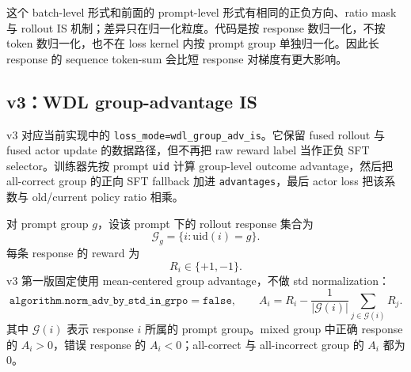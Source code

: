这个 batch-level 形式和前面的 prompt-level 形式有相同的正负方向、ratio mask 与 rollout IS 机制；差异只在归一化粒度。代码是按 response 数归一化，不按 token 数归一化，也不在 loss kernel 内按 prompt group 单独归一化。因此长 response 的 sequence token-sum 会比短 response 对梯度有更大影响。

\subsection{v3：WDL group-advantage IS}
\label{subsec:v3}

v3 对应当前实现中的 \texttt{loss\_mode=wdl\_group\_adv\_is}。它保留 fused rollout 与 fused actor update 的数据路径，但不再把 raw reward label 当作正负 SFT selector。训练器先按 prompt \texttt{uid} 计算 group-level outcome advantage，然后把 all-correct group 的正向 SFT fallback 加进 \texttt{advantages}，最后 actor loss 把该系数与 old/current policy ratio 相乘。

对 prompt group $g$，设该 prompt 下的 rollout response 集合为
\begin{equation}
    \mathcal{G}_g=\{i:\mathrm{uid}(i)=g\}.
\end{equation}
每条 response 的 reward 为
\begin{equation}
    R_i\in\{+1,-1\}.
\end{equation}
v3 第一版固定使用 mean-centered group advantage，不做 std normalization：
\begin{equation}
    \texttt{algorithm.norm\_adv\_by\_std\_in\_grpo}=\texttt{false},
    \qquad
    A_i
    =
    R_i-\frac{1}{|\mathcal{G}(i)|}
    \sum_{j\in\mathcal{G}(i)}R_j.
    \label{eq:v3_group_adv}
\end{equation}
其中 $\mathcal{G}(i)$ 表示 response $i$ 所属的 prompt group。mixed group 中正确 response 的 $A_i>0$，错误 response 的 $A_i<0$；all-correct 与 all-incorrect group 的 $A_i$ 都为 $0$。

